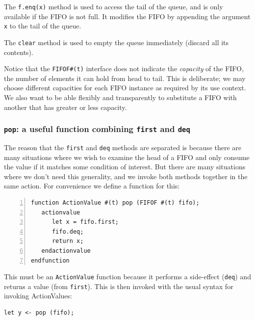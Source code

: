The \verb|f.enq(x)| method is used to access the tail of the queue,
and is only available if the FIFO is not full.  It modifies the FIFO
by appending the argument \verb|x| to the tail of the queue.

The \verb|clear| method is used to empty the queue immediately
(discard all its contents).

Notice that the {\tt FIFOF\#(t)} interface does not indicate the
\emph{capacity} of the FIFO, {\ie} the number of elements it can hold
from head to tail.  This is deliberate; we may choose different
capacities for each FIFO instance as required by its use context.  We
also want to be able flexibly and transparently to substitute a FIFO
with another that has greater or less capacity.


\subsubsection{{\tt pop}: a useful function combining {\tt first} and {\tt deq}}

\label{Sec_FIFOF_pop}


The reason that the \verb|first| and \verb|deq| methods are separated
is because there are many situations where we wish to examine the head
of a FIFO and only consume the value if it matches some condition of
interest.  But there are many situations where we don't need this
generality, and we invoke both methods together in the same action.
For convenience we define a function for this:

{\small
\begin{Verbatim}[frame=single, numbers=left]
function ActionValue #(t) pop (FIFOF #(t) fifo);
   actionvalue
      let x = fifo.first;
      fifo.deq;
      return x;
   endactionvalue
endfunction
\end{Verbatim}
}

This must be an {\tt ActionValue} function because it performs a
side-effect ({\tt deq}) and returns a value (from {\tt first}).  This
is then invoked with the usual syntax for invoking ActionValues:

{\small
\begin{Verbatim}[frame=single]
   let y <- pop (fifo);
\end{Verbatim}
}



